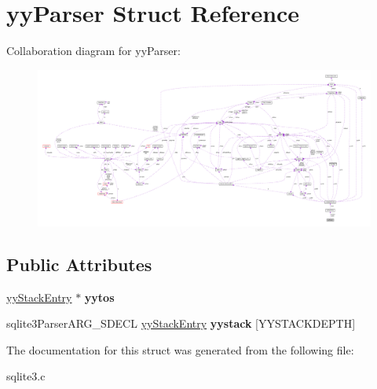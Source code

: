 \hypertarget{structyyParser}{}\section{yy\+Parser Struct Reference}
\label{structyyParser}


Collaboration diagram for yy\+Parser\+:\nopagebreak
\begin{figure}[H]
\begin{center}
\leavevmode
\includegraphics[width=350pt]{structyyParser__coll__graph}
\end{center}
\end{figure}
\subsection*{Public Attributes}
\begin{DoxyCompactItemize}
\item 
\hyperlink{structyyStackEntry}{yy\+Stack\+Entry} $\ast$ {\bfseries yytos}\hypertarget{structyyParser_aa00139fa506498c5b8539d502d8052f0}{}\label{structyyParser_aa00139fa506498c5b8539d502d8052f0}

\item 
sqlite3\+Parser\+A\+R\+G\+\_\+\+S\+D\+E\+CL \hyperlink{structyyStackEntry}{yy\+Stack\+Entry} {\bfseries yystack} \mbox{[}Y\+Y\+S\+T\+A\+C\+K\+D\+E\+P\+TH\mbox{]}\hypertarget{structyyParser_ae8bc1531d6ae56020a7ee33a40783672}{}\label{structyyParser_ae8bc1531d6ae56020a7ee33a40783672}

\end{DoxyCompactItemize}


The documentation for this struct was generated from the following file\+:\begin{DoxyCompactItemize}
\item 
sqlite3.\+c\end{DoxyCompactItemize}
